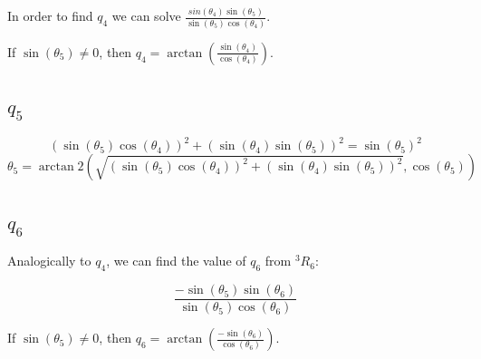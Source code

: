 \documentclass{article}
\begin{document}
In order to find $q_4$ we can solve $\frac{sin(\theta_4) \sin(\theta_5)}{\sin(\theta_5) \cos(\theta_4)}$. 

If $\sin(\theta_5) \neq 0$, then $q_4 = \arctan(\frac{\sin(\theta_4)}{\cos(\theta_4)})$. 


\subsection{$q_5$}

\[\left(\sin(\theta_5) \cos(\theta_4)\right)^2 + \left(\sin(\theta_4) \sin(\theta_5)\right)^2 = \sin(\theta_5)^2\]
\[ \theta_5= \arctan2(\sqrt{\left(\sin(\theta_5) \cos(\theta_4)\right)^2 + \left(\sin(\theta_4) \sin(\theta_5)\right)^2}, \cos(\theta_5)) \]



\subsection{$q_6$}

Analogically to $q_4$, we can find the value of $q_6$ from ${}^3R_6$:

\[\frac{-\sin(\theta_5) \sin(\theta_6)}{\sin(\theta_5) \cos(\theta_6)}\]

If $\sin(\theta_5) \neq 0$, then $q_6 = \arctan(\frac{-\sin(\theta_6)}{\cos(\theta_6)})$. 








\end{document}
